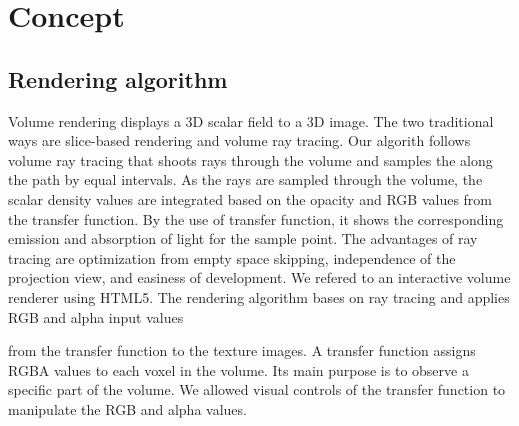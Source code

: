 \documentclass{acm_proc_article-sp}
\begin{document}
\section{Concept}
\subsection{Rendering algorithm}

Volume rendering displays a 3D scalar field to a 3D image. The two traditional ways are slice-based rendering and volume ray tracing. Our algorith follows volume ray tracing that shoots rays through the volume and samples the along the path by equal intervals. As the rays are sampled through the volume, the scalar density values are integrated based on the opacity and RGB values from the transfer function. By the use of transfer function, it shows the corresponding emission and absorption of light for the sample point. The advantages of ray tracing are optimization from empty space skipping, independence of the projection view, and easiness of development.
We refered to an interactive volume renderer using HTML5. The rendering algorithm bases on ray tracing and applies RGB and alpha input values 

from the transfer function to the texture images. A transfer function assigns RGBA values to each voxel in the volume. Its main purpose is to observe a specific part of the volume. We allowed visual controls of the transfer function to manipulate the RGB and alpha values. 
\end{document}
